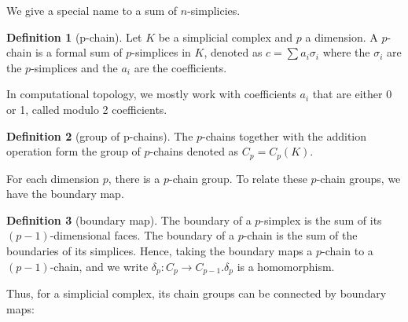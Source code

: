 \documentclass[12pt]{article}
\theoremstyle{definition}
\newtheorem{definition}{Definition}
\begin{document}
We give a special name to a sum of $n$-simplicies.
\begin{definition}[p-chain]
Let $K$ be a simplicial complex and $p$ a dimension. A
$p$-chain is a formal sum of $p$-simplices in $K$, denoted as $c=\sum a_i \sigma_i$ where the $\sigma_i$ are the $p$-simplices and the $a_i$ are the coefficients. 
\par In computational topology, we mostly work with coefficients $a_i$ that are either 0 or 1, called modulo 2 coefficients.
\end{definition}
\begin{definition}[group of p-chains]
The $p$-chains together with the addition operation form the group of $p$-chains denoted as $C_p = C_p(K)$.
\end{definition}
For each dimension $p$, there is a $p$-chain group. To relate these $p$-chain groups, we have the boundary map.
\begin{definition}[boundary map]
The boundary of a $p$-simplex is the sum of its $(p-1)$-dimensional faces. The boundary of a $p$-chain is the sum of the boundaries of its simplices. Hence, taking the boundary maps a $p$-chain to a $(p-1)$-chain, and we write $\delta_p : C_p \rightarrow C_{p-1}$.$\delta_p$ is a homomorphism.
\end{definition}
Thus, for a simplicial complex, its chain groups can be connected by boundary maps:
\end{document}
